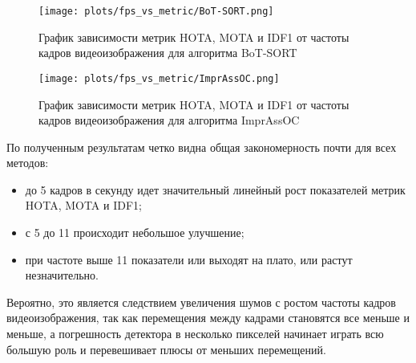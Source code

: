 \begin{figure}[ht]
    \centering
    \texttt{[image: plots/fps\_vs\_metric/BoT-SORT.png]}
    \caption{График зависимости метрик HOTA, MOTA и IDF1 от частоты кадров видеоизображения для алгоритма BoT-SORT}
    \label{fig:fps_BoT-SORT}
\end{figure}

\begin{figure}[ht]
    \centering
    \texttt{[image: plots/fps\_vs\_metric/ImprAssOC.png]}
    \caption{График зависимости метрик HOTA, MOTA и IDF1 от частоты кадров видеоизображения для алгоритма ImprAssOC}
    \label{fig:fps_ImprAssOC}
\end{figure}
\FloatBarrier

По полученным результатам четко видна общая закономерность почти для всех методов: 
\begin{itemize}
    \item до 5 кадров в секунду идет значительный линейный рост показателей метрик HOTA, MOTA и IDF1;
    \item с 5 до 11 происходит небольшое улучшение;
    \item при частоте выше 11 показатели или выходят на плато, или растут незначительно.
\end{itemize}
Вероятно, это является следствием увеличения шумов с ростом частоты кадров видеоизображения, так как перемещения между кадрами становятся все меньше и меньше, а погрешность детектора в несколько пикселей начинает играть всю большую роль и перевешивает плюсы от меньших перемещений.